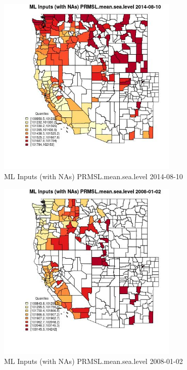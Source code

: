 \begin{figure} 
\centering  
\includegraphics[width=0.77\textwidth]{Code_Outputs/Report_ML_input_PM25_Step4_part_e_de_duplicated_aves_compiled_2019-05-18wNAs_CountyPRMSLmeansealevelMean2014-08-10_2014-08-10.jpg} 
\caption{\label{fig:Report_ML_input_PM25_Step4_part_e_de_duplicated_aves_compiled_2019-05-18wNAsCountyPRMSLmeansealevelMean2014-08-10_2014-08-10}ML Inputs (with NAs) PRMSL.mean.sea.level 2014-08-10} 
\end{figure} 
 

\clearpage 

\begin{figure} 
\centering  
\includegraphics[width=0.77\textwidth]{Code_Outputs/Report_ML_input_PM25_Step4_part_e_de_duplicated_aves_compiled_2019-05-18wNAs_CountyPRMSLmeansealevelMean2008-01-02_2008-01-02.jpg} 
\caption{\label{fig:Report_ML_input_PM25_Step4_part_e_de_duplicated_aves_compiled_2019-05-18wNAsCountyPRMSLmeansealevelMean2008-01-02_2008-01-02}ML Inputs (with NAs) PRMSL.mean.sea.level 2008-01-02} 
\end{figure} 
 


